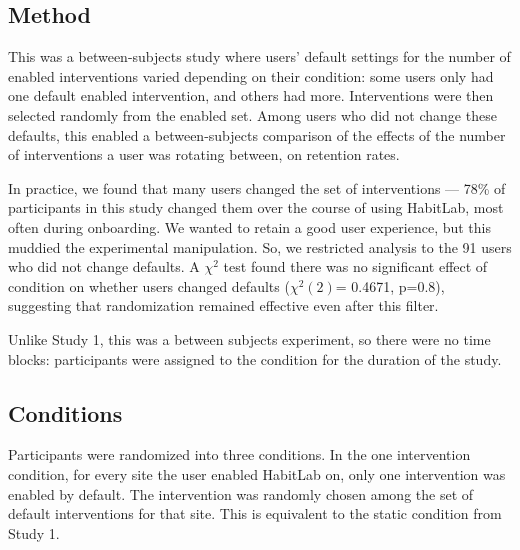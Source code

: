 \subsection{Method}

This was a between-subjects study where users' default settings for the number of enabled interventions varied depending on their condition: some users only had one default enabled intervention, and others had more. Interventions were then selected randomly from the enabled set. Among users who did not change these defaults, this enabled a between-subjects comparison of the effects of the number of interventions a user was rotating between, on retention rates.


In practice, we found that many users changed the set of interventions --- 78\% of participants in this study changed them over the course of using HabitLab, most often during onboarding. We wanted to retain a good user experience, but this muddied the experimental manipulation. So, we restricted analysis to the 91 users who did not change defaults. A $\chi^2$ test found there was no significant effect of condition on whether users changed defaults ($\chi^2(2)$= 0.4671, p=0.8), suggesting that randomization remained effective even after this filter.


Unlike Study 1, this was a between subjects experiment, so there were no time blocks: participants were assigned to the condition for the duration of the study.

\subsection{Conditions}
Participants were randomized into three conditions. In the one intervention condition, for every site the user enabled HabitLab on, only one intervention was enabled by default. The intervention was randomly chosen among the set of default interventions for that site. This is equivalent to the static condition from Study 1.

